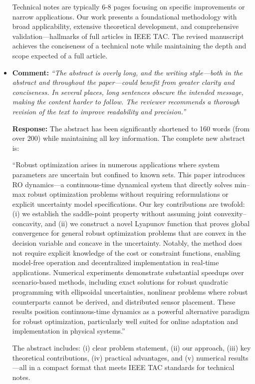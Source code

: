 \documentclass[journal,twoside,web]{ieeecolor}
\newcommand{\rev}[1]{\textcolor{revisionblue}{#1}}
\begin{document}
\begin{itemize}
Technical notes are typically 6-8 pages focusing on specific improvements or narrow applications. Our work presents a foundational methodology with broad applicability, extensive theoretical development, and comprehensive validation—hallmarks of full articles in IEEE TAC. The revised manuscript achieves the conciseness of a technical note while maintaining the depth and scope expected of a full article.\\

\item  \textbf{Comment:} \textit{``The abstract is overly long, and the writing style—both in the abstract and throughout the paper—could benefit from greater clarity and conciseness. In several places, long sentences obscure the intended message, making the content harder to follow. The reviewer recommends a thorough revision of the text to improve readability and precision.''}

\textbf{Response:} The abstract has been significantly shortened to 160 words (from over 200) while maintaining all key information. The complete new abstract is:

\rev{``Robust optimization arises in numerous applications where system parameters are uncertain but confined to known sets. This paper introduces RO dynamics—a continuous-time dynamical system that directly solves min–max robust optimization problems without requiring reformulations or explicit uncertainty model specifications. Our key contributions are twofold: (i) we establish the saddle-point property without assuming joint convexity–concavity, and (ii) we construct a novel Lyapunov function that proves global convergence for general robust optimization problems that are convex in the decision variable and concave in the uncertainty. Notably, the method does not require explicit knowledge of the cost or constraint functions, enabling model-free operation and decentralized implementation in real-time applications. Numerical experiments demonstrate substantial speedups over scenario-based methods, including exact solutions for robust quadratic programming with ellipsoidal uncertainties, nonlinear problems where robust counterparts cannot be derived, and distributed sensor placement. These results position continuous-time dynamics as a powerful alternative paradigm for robust optimization, particularly well suited for online adaptation and implementation in physical systems.''}

The abstract includes: (i) clear problem statement, (ii) our approach, (iii) key theoretical contributions, (iv) practical advantages, and (v) numerical results—all in a compact format that meets IEEE TAC standards for technical notes.\\


\end{itemize}
\end{document}
